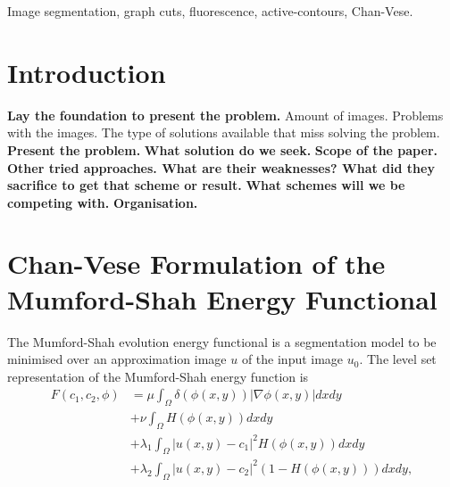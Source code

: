 \documentclass[10pt, journal, letterpaper, onecolumn, draftcls]{IEEEtran}
\begin{document}
\begin{IEEEkeywords}
Image segmentation, graph cuts, fluorescence, active-contours, Chan-Vese.
\end{IEEEkeywords}






%



\section{Introduction}
\textbf{Lay the foundation to present the problem.} Amount of images. Problems with the images. The type of solutions available that miss solving the problem.
\textbf{Present the problem.}
\textbf{What solution do we seek.}
\textbf{Scope of the paper.}
\textbf{Other tried approaches. What are their weaknesses? What did they sacrifice to get that scheme or result.}
\textbf{What schemes will we be competing with.}
\textbf{Organisation.}


\section{Chan-Vese Formulation of the Mumford-Shah Energy Functional}
The Mumford-Shah evolution energy functional is a segmentation model to be minimised over an approximation image $u$ of the input image $u_0$. The level set representation of the Mumford-Shah energy function is 
\begin{equation}
\begin{split}
	F(c_1, c_2, \phi) & = \mu \int_\Omega \delta(\phi(x,y))|\nabla\phi(x,y)|dxdy \\
	& + \nu \int_\Omega H(\phi(x,y))dxdy \\
	& + \lambda_1 \int_\Omega |u(x,y)-c_1|^2H(\phi(x,y))dxdy \\
	& + \lambda_2 \int_\Omega |u(x,y)-c_2|^2(1-H(\phi(x,y)))dxdy,
	\end{split}
	\label{eq:mumfordshahfunction}
\end{equation}
\end{document}
